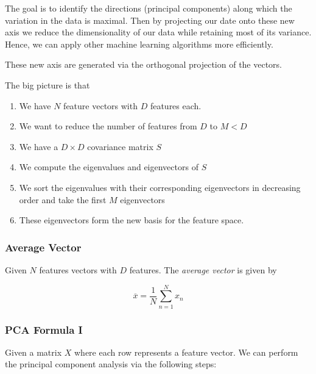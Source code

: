 The goal is to identify the directions (principal components) along which the variation in the data is maximal. Then by projecting 
our date onto these new axis we reduce the dimensionality of our data while retaining most of its variance. Hence, we can apply other 
machine learning algorithms more efficiently. 

These new axis are generated via the orthogonal projection of the vectors.

The big picture is that 

\begin{enumerate}

    \item We have \(N\) feature vectors with \(D\) features each.

    \item We want to reduce the number of features from \(D\) to \(M < D\) 

    \item We have a \(D \times D\) covariance matrix \(S\)

    \item We compute the eigenvalues and eigenvectors of \(S\)

    \item We sort the eigenvalues with their corresponding eigenvectors in decreasing order and take the first \(M\) eigenvectors 

    \item These eigenvectors form the new basis for the feature space.

\end{enumerate}

\subsubsection{Average Vector}

Given \(N\) features vectors with \(D\) features. The \emph{average vector} is given 
by

\[
    \overline{x} = \frac{1}{N} \sum_{n = 1}^{N} x_n
\]

\subsubsection{PCA Formula I}

Given a matrix \(X\) where each row represents a feature vector. We can perform the 
principal component analysis via the following steps:

